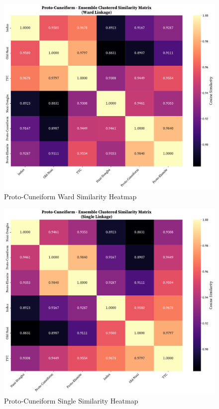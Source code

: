 \documentclass[11pt,a4paper,oneside]{report}
\begin{document}
\begin{figure}[H]
    \centering
    \includegraphics[width=0.75\linewidth]{Visualizations/Clustered Heatmaps/Proto-Cuneiform/ensemble_clustered_similarity_ward.pdf}
     \caption*{Proto-Cuneiform Ward Similarity Heatmap}
\end{figure}
 \begin{figure}[H]
    \centering
    \includegraphics[width=0.75\linewidth]{Visualizations/Clustered Heatmaps/Proto-Cuneiform/ensemble_clustered_similarity_single.pdf}
     \caption*{Proto-Cuneiform Single Similarity Heatmap}
\end{figure}
\end{document}
